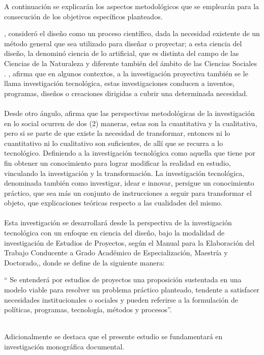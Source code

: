 A continuación se explicarán los aspectos metodológicos que se emplearán para la consecución de los objetivos específicos planteados. 

\citet{simon1996sciences}, consideró el diseño como un proceso científico, dada la necesidad existente de un método general que sea utilizado para diseñar o proyectar; a esta ciencia del diseño, la denominó ciencia de lo artificial, que es distinta del campo de las Ciencias de la Naturaleza y diferente también del ámbito de las Ciencias Sociales \cite[pp. 42-43]{gonzalez2007configuracion}. \citet[pp. 567-569]{hurtado2012metodologia}, afirma que en algunos contextos, a la investigación proyectiva también se le llama investigación tecnológica, estas  investigaciones conducen a inventos, programas, diseños o creaciones dirigidas a cubrir una determinada necesidad.
\\
\\ 
Desde otro ángulo, \citet{cordoba2005investigacion} afirma que las perspectivas metodológicas de la investigación en lo social ocurren de dos (2) maneras, estas son la cuantitativa y la cualitativa, pero si se parte de que existe la necesidad de transformar, entonces ni lo cuantitativo ni lo cualitativo son suficientes, de allí que se recurra a lo tecnológico. Definiendo a la investigación tecnológica como aquella que tiene por fin obtener un conocimiento para lograr modificar la realidad en estudio, vinculando la investigación y la transformación. La investigación tecnológica, denominada también como investigar, idear e innovar, persigue un conocimiento práctico, que sea más un conjunto de instrucciones a seguir para transformar el objeto, que explicaciones teóricas respecto a las cualidades del mismo. \\
\\
Esta investigación se desarrollará desde la perspectiva de la investigación tecnológica con un enfoque en ciencia del diseño, bajo la modalidad de investigación de Estudios de Proyectos, según el Manual para la Elaboración del Trabajo Conducente a Grado Académico de Especialización, Maestría y Doctorado,\citet[p. 63]{UCLAmanual2002}, donde se define de la siguiente manera:
\begin{citatextual}
`` Se entenderá por estudios de proyectos una proposición sustentada en una modelo viable para resolver un problema práctico planteado, tendente a satisfacer necesidades institucionales o sociales y pueden referirse a la formulación de políticas, programas, tecnología, métodos y procesos''.
\end{citatextual}
\\
Adicionalmente se destaca que el presente estudio se fundamentará en investigación monográfica documental.

